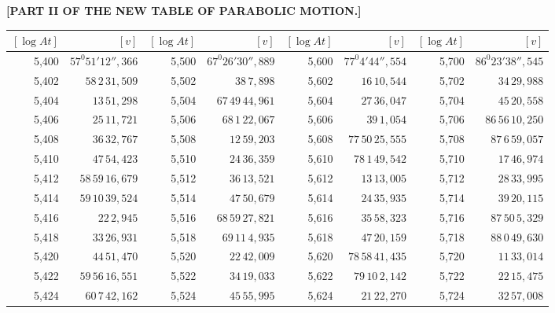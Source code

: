 \clearpage
{}
\begingroup
\centering
\fontsize{9}{9}\selectfont
\setlength{\tabcolsep}{1.25pt}
\renewcommand{\arraystretch}{.9}
\setlength{\parskip}{0pt}
\textbf{[PART II OF THE NEW TABLE OF PARABOLIC MOTION.]}
\par\vspace{7pt}
\begin{tabular}{|r|r||r|r||r|r||r|r|}
\hline
\([\log At]\) & \([v]\) & \([\log At]\) & \([v]\) & \([\log At]\) & \([v]\) & \([\log At]\) & \([v]\) \\
\hline
5,400 & \(57^{0}51'12'',\!366\) & 5,500 & \(67^{0}26'30'',\!889\) & 5,600 & \(77^{0}4'44'',\!554\) & 5,700 & \(86^{0}23'38'',\!545\) \\[1pt]
5,402 & \(58\,2\,31,\!509\) & 5,502 & \(38\,7,\!898\) & 5,602 & \(16\,10,\!544\) & 5,702 & \(34\,29,\!988\) \\
5,404 & \(13\,51,\!298\) & 5,504 & \(67\,49\,44,\!961\) & 5,604 & \(27\,36,\!047\) & 5,704 & \(45\,20,\!558\) \\
5,406 & \(25\,11,\!721\) & 5,506 & \(68\,1\,22,\!067\) & 5,606 & \(39\,1,\!054\) & 5,706 & \(86\,56\,10,\!250\) \\
5,408 & \(36\,32,\!767\) & 5,508 & \(12\,59,\!203\) & 5,608 & \(77\,50\,25,\!555\) & 5,708 & \(87\,6\,59,\!057\) \\
5,410 & \(47\,54,\!423\) & 5,510 & \(24\,36,\!359\) & 5,610 & \(78\,1\,49,\!542\) & 5,710 & \(17\,46,\!974\) \\[1pt]
5,412 & \(58\,59\,16,\!679\) & 5,512 & \(36\,13,\!521\) & 5,612 & \(13\,13,\!005\) & 5,712 & \(28\,33,\!995\) \\
5,414 & \(59\,10\,39,\!524\) & 5,514 & \(47\,50,\!679\) & 5,614 & \(24\,35,\!935\) & 5,714 & \(39\,20,\!115\) \\
5,416 & \(22\,2,\!945\) & 5,516 & \(68\,59\,27,\!821\) & 5,616 & \(35\,58,\!323\) & 5,716 & \(87\,50\,5,\!329\) \\
5,418 & \(33\,26,\!931\) & 5,518 & \(69\,11\,4,\!935\) & 5,618 & \(47\,20,\!159\) & 5,718 & \(88\,0\,49,\!630\) \\
5,420 & \(44\,51,\!470\) & 5,520 & \(22\,42,\!009\) & 5,620 & \(78\,58\,41,\!435\) & 5,720 & \(11\,33,\!014\) \\[1pt]
5,422 & \(59\,56\,16,\!551\) & 5,522 & \(34\,19,\!033\) & 5,622 & \(79\,10\,2,\!142\) & 5,722 & \(22\,15,\!475\) \\
5,424 & \(60\,7\,42,\!162\) & 5,524 & \(45\,55,\!995\) & 5,624 & \(21\,22,\!270\) & 5,724 & \(32\,57,\!008\) \\

\end{tabular}
